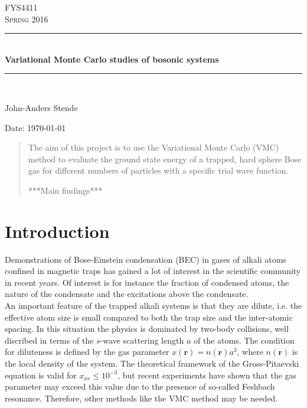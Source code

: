 \documentclass[english, a4paper]{article}
\begin{document}
\renewcommand{\figurename}{Figure}
\begin{titlepage}
\begin{center}

\textsc{\Large FYS4411}\\[0.5cm]
\textsc{\Large Spring 2016}\\[1.5cm]
\rule{\linewidth}{0.5mm} \\[0.4cm]
{ \huge \bfseries Variational Monte Carlo studies of bosonic systems}\\[0.10cm]
\rule{\linewidth}{0.5mm} \\[1.5cm]

\begin{minipage}{0.49\textwidth}
    \begin{center} \large
        John-Anders Stende \\[0.8cm]
    \end{center}
\end{minipage}


\vfill

\large{Date: \today}

\end{center}
\end{titlepage}


\begin{abstract}
The aim of this project is to use the Variational Monte Carlo (VMC) method to evaluate the 
ground state energy of a trapped, hard sphere Bose gas for different numbers of particles
with a specific trial wave function. 

***Main findings***
\end{abstract}


\section{Introduction}
Demonstrations of Bose-Einstein condensation (BEC) in gases of alkali atoms confined in magnetic traps has gained
a lot of interest in the scientific community in recent years. Of interest is for instance the fraction of condensed atoms, 
the nature of the condensate and the excitations above the condensate. \\

\noindent An important feature of the trapped alkali systems is that they are dilute, i.e. the effective atom size
is small compared to both the trap size and the inter-atomic spacing. In this situation the physics is
dominated by two-body collisions, well discribed in terms of the $s$-wave scattering length $a$ of the atoms.
The condition for diluteness is defined by the gas parameter $x(\mathbf{r}) = n(\mathbf{r})a^3$, where $n(\mathbf{r})$
is the local density of the system. The theoretical framework of the Gross-Pitaevski equation is valid for $x_{av} \leq 10^{-3}$,
but recent experiments have shown that the gas parameter may exceed this value due to the presence of so-called Feshbach resonance.
Therefore, other methods like the VMC method may be needed. \\
\end{document}
